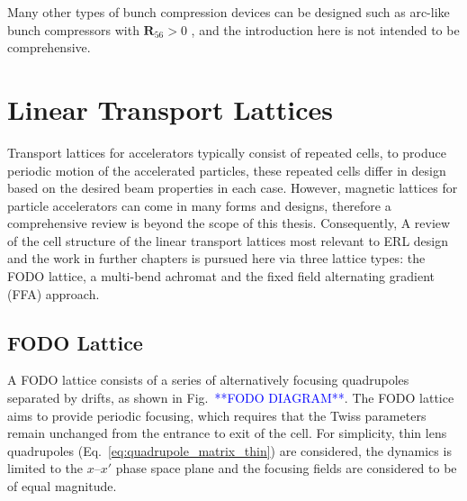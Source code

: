 \documentclass[../main.tex]{subfiles}
\begin{document}
Many other types of bunch compression devices can be designed such as arc-like bunch compressors \cite{williams2020arclike} with $\boldsymbol{R}_{56}>0$ , and the introduction here is not intended to be comprehensive. 

\section{Linear Transport Lattices}

Transport lattices for accelerators typically consist of repeated cells, to produce periodic motion of the accelerated particles, these repeated cells differ in design based on the desired beam properties in each case. However, magnetic lattices for particle accelerators can come in many forms and designs, therefore a comprehensive review is beyond the scope of this thesis. Consequently, A review of the cell structure of the linear transport lattices most relevant to ERL design and the work in further chapters is pursued here via three lattice types: the FODO lattice, a multi-bend achromat and the fixed field alternating gradient (FFA) approach. 

\subsection{FODO Lattice}
\label{sec:FODO_lattice}

A FODO lattice consists of a series of alternatively focusing quadrupoles separated by drifts, as shown in Fig.~\textcolor{blue}{**FODO DIAGRAM**}. The FODO lattice aims to provide periodic focusing, which requires that the Twiss parameters remain unchanged from the entrance to exit of the cell. For simplicity, thin lens quadrupoles (Eq.~\ref{eq:quadrupole_matrix_thin}) are considered, the dynamics is limited to the $x$--$x'$ phase space plane and the focusing fields are considered to be of equal magnitude.
\end{document}

